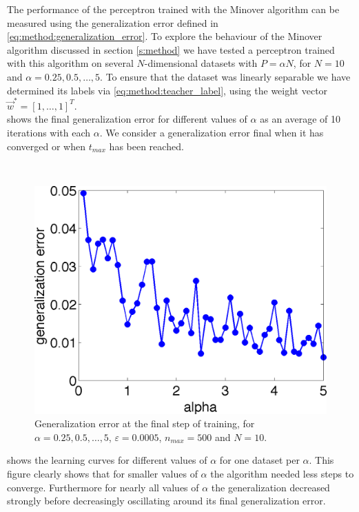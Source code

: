 The performance of the perceptron trained with the Minover algorithm can be measured using the generalization error defined in \autoref{eq:method:generalization_error}. To explore the behaviour of the Minover algorithm discussed in section \ref{s:method} we have tested a perceptron trained with this algorithm on several $N$-dimensional datasets with $P = \alpha N$, for $N = 10$ and $\alpha = 0.25, 0.5, \dotsc, 5$. To ensure that the dataset was linearly separable we have determined its labels via \eqref{eq:method:teacher_label}, using the weight vector $\vec{w}^* = [1, \dotsc, 1]^T$.\\

 shows the final generalization error for different values of $\alpha$ as an average of 10 iterations with each $\alpha$. We consider a generalization error final when it has converged or when $t_{max}$ has been reached. 


~\\

\begin{figure}[H]
	\centering
	\includegraphics[width=0.9\columnwidth]{./img/finalgeneralizationerrors}
	\caption{Generalization error at the final step of training, for $\alpha = 0.25, 0.5, \dotsc, 5$, $\varepsilon = 0.0005$, $n_{max} = 500$ and $N = 10$.}
	\label{fig:exp:finalgeneralizationError}
\end{figure}

 shows the learning curves for different values of $\alpha$ for one dataset per $\alpha$. This figure clearly shows that for smaller values of $\alpha$ the algorithm needed less steps to converge. Furthermore for nearly all values of $\alpha$ the generalization decreased strongly before decreasingly oscillating around its final generalization error.

